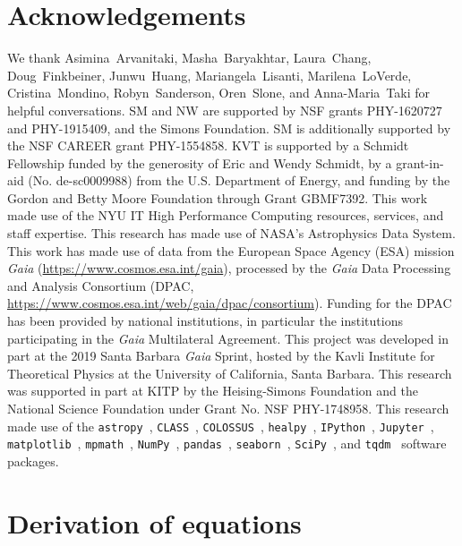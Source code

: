 \documentclass[prd,aps,twocolumn,nofootinbib,superscriptaddress,preprintnumbers,balancelastpage,longbibliography,floatfix]{revtex4-1}
\begin{document}
\section*{Acknowledgements}
We thank Asimina~Arvanitaki, Masha~Baryakhtar, Laura~Chang, Doug~Finkbeiner, Junwu~Huang, Mariangela~Lisanti, Marilena~LoVerde, Cristina~Mondino, Robyn~Sanderson, Oren~Slone, and Anna-Maria~Taki for helpful conversations. SM and NW are supported by NSF grants PHY-1620727 and PHY-1915409, and the Simons Foundation. SM is additionally supported by the NSF CAREER grant PHY-1554858. KVT is supported by a Schmidt Fellowship funded by the generosity of Eric and Wendy Schmidt, by a grant-in-aid (No. de-sc0009988) from the U.S. Department of Energy, and funding by the Gordon and Betty Moore Foundation through Grant GBMF7392. This work made use of the NYU IT High Performance Computing resources, services, and staff expertise. This research has made use of NASA's Astrophysics Data System. This work has made use of data from the European Space Agency (ESA) mission {\it Gaia} (\url{https://www.cosmos.esa.int/gaia}), processed by the {\it Gaia} Data Processing and Analysis Consortium (DPAC, \url{https://www.cosmos.esa.int/web/gaia/dpac/consortium}). Funding for the DPAC has been provided by national institutions, in particular the institutions participating in the {\it Gaia} Multilateral Agreement. This project was developed in part at the 2019 Santa Barbara {\it Gaia} Sprint, hosted by the Kavli Institute for Theoretical Physics at the University of California, Santa Barbara. This research was supported in part at KITP by the Heising-Simons Foundation and the National Science Foundation under Grant No. NSF PHY-1748958. This research made use of the \texttt{astropy}~\cite{Robitaille:2013mpa,Price-Whelan:2018hus}, \texttt{CLASS}~\cite{Blas:2011rf}, \texttt{COLOSSUS}~\cite{Diemer:2017bwl}, \texttt{healpy}~\cite{Gorski:2004by,Zonca2019}, \texttt{IPython}~\cite{PER-GRA:2007}, \texttt{Jupyter}~\cite{Kluyver2016JupyterN}, \texttt{matplotlib}~\cite{Hunter:2007}, \texttt{mpmath}~\cite{mpmath}, \texttt{NumPy}~\cite{numpy:2011}, \texttt{pandas}~\cite{mckinney-proc-scipy-2010}, \texttt{seaborn}~\cite{seaborn}, \texttt{SciPy}~\cite{2020SciPy-NMeth}, and \texttt{tqdm}~\cite{da2019tqdm} software packages. 

\appendix 

\section{Derivation of equations}
\label{app:derivations}
\end{document}
